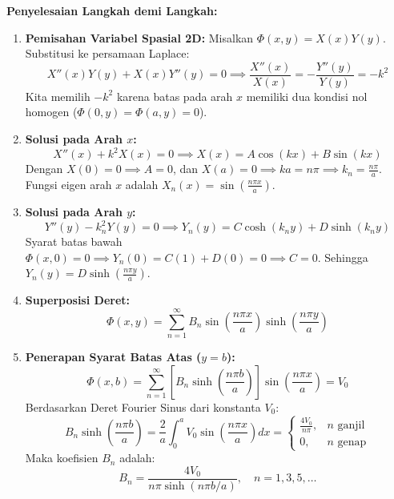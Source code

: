 \documentclass[11pt,a4paper]{article}
\theoremstyle{definition}
\begin{document}
\noindent\textbf{Penyelesaian Langkah demi Langkah:}
\begin{enumerate}[leftmargin=*]
    \item \textbf{Pemisahan Variabel Spasial 2D:}
    Misalkan $\Phi(x, y) = X(x) Y(y)$. Substitusi ke persamaan Laplace:
    \begin{equation*}
        X''(x) Y(y) + X(x) Y''(y) = 0 \implies \frac{X''(x)}{X(x)} = -\frac{Y''(y)}{Y(y)} = -k^2
    \end{equation*}
    Kita memilih $-k^2$ karena batas pada arah $x$ memiliki dua kondisi nol homogen ($\Phi(0, y) = \Phi(a, y) = 0$).
    
    \item \textbf{Solusi pada Arah $x$:}
    \begin{equation*}
        X''(x) + k^2 X(x) = 0 \implies X(x) = A \cos(kx) + B \sin(kx)
    \end{equation*}
    Dengan $X(0) = 0 \implies A = 0$, dan $X(a) = 0 \implies ka = n\pi \implies k_n = \frac{n\pi}{a}$.
    Fungsi eigen arah $x$ adalah $X_n(x) = \sin\left(\frac{n\pi x}{a}\right)$.
    
    \item \textbf{Solusi pada Arah $y$:}
    \begin{equation*}
        Y''(y) - k_n^2 Y(y) = 0 \implies Y_n(y) = C \cosh(k_n y) + D \sinh(k_n y)
    \end{equation*}
    Syarat batas bawah $\Phi(x, 0) = 0 \implies Y_n(0) = C(1) + D(0) = 0 \implies C = 0$.
    Sehingga $Y_n(y) = D \sinh\left(\frac{n\pi y}{a}\right)$.
    
    \item \textbf{Superposisi Deret:}
    \begin{equation*}
        \Phi(x, y) = \sum_{n=1}^{\infty} B_n \sin\left(\frac{n\pi x}{a}\right) \sinh\left(\frac{n\pi y}{a}\right)
    \end{equation*}
    
    \item \textbf{Penerapan Syarat Batas Atas ($y = b$):}
    \begin{equation*}
        \Phi(x, b) = \sum_{n=1}^{\infty} \left[ B_n \sinh\left(\frac{n\pi b}{a}\right) \right] \sin\left(\frac{n\pi x}{a}\right) = V_0
    \end{equation*}
    Berdasarkan Deret Fourier Sinus dari konstanta $V_0$:
    \begin{equation*}
        B_n \sinh\left(\frac{n\pi b}{a}\right) = \frac{2}{a} \int_{0}^{a} V_0 \sin\left(\frac{n\pi x}{a}\right) dx = \begin{cases} \frac{4V_0}{n\pi}, & n \text{ ganjil} \\ 0, & n \text{ genap} \end{cases}
    \end{equation*}
    Maka koefisien $B_n$ adalah:
    \begin{equation*}
        B_n = \frac{4V_0}{n\pi \sinh(n\pi b / a)}, \quad n = 1, 3, 5, \dots
    \end{equation*}
    

\end{enumerate}
\end{document}
